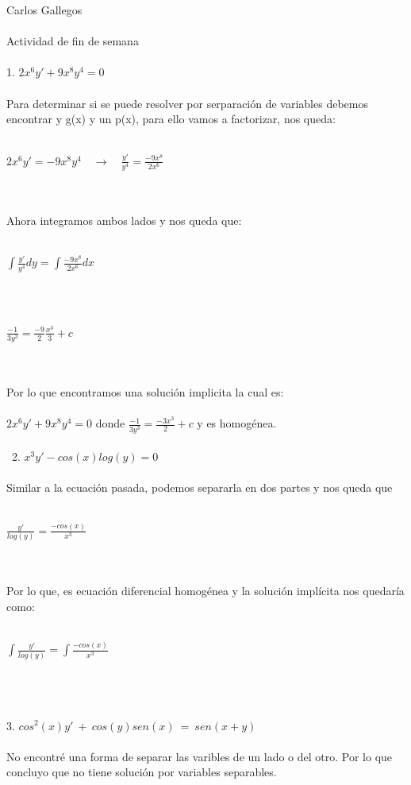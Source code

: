 \documentclass[a4paper,10pt]{article}
\title{}
\author{}
\date{}
\begin{document}
\maketitle
Carlos Gallegos\\\\
Actividad de fin de semana\\\\
1. $2x^6 y' + 9x^8 y^4 =0$\\\\
Para determinar si se puede resolver por serparación de variables debemos encontrar y g(x) y un p(x), para ello vamos a factorizar, nos queda:\\\\
\centerline{$ 2x^6y' = - 9x^8 y^4 \quad\rightarrow\quad \frac{y'}{y^4} = \frac{-9x^8}{2x^6}$ }\\\\
Ahora integramos ambos lados y nos queda que:\\\\
\centerline{$\int \frac{y'}{y^4} dy = \int \frac{-9x^8}{2x^6} dx$}\\\\
\centerline{$ \frac{-1}{3y^3} = \frac{-9}{2} \frac{x^3}{3} + c$ }\\\\
Por lo que encontramos una solución implicita la cual es:\\\\
$2x^6 y' + 9x^8 y^4 =0$ donde $ \frac{-1}{3y^3} = \frac{-3x^3}{2} + c$ y es homogénea. \\\\\
2. $x^3 y' - cos(x)log(y)=0 $\\\\
Similar a la ecuación pasada, podemos separarla en dos partes y nos queda que\\\\
\centerline{$\frac{y'}{log(y)} = \frac{-cos(x)}{x^3}  $}\\\\
Por lo que, es ecuación diferencial homogénea y la solución implícita nos quedaría como:\\\\
\centerline{$\int \frac{y'}{log(y)} = \int \frac{-cos(x)}{x^3}  $ }\\\\\\
3. $cos^2\left(x\right)y'\:+\:cos\left(y\right)sen\left(x\right)\:=\:sen\left(x+y\right)$\\\\
No encontré una forma de separar las varibles de un lado o del otro. Por lo que concluyo que no tiene solución por variables separables.
\end{document}
